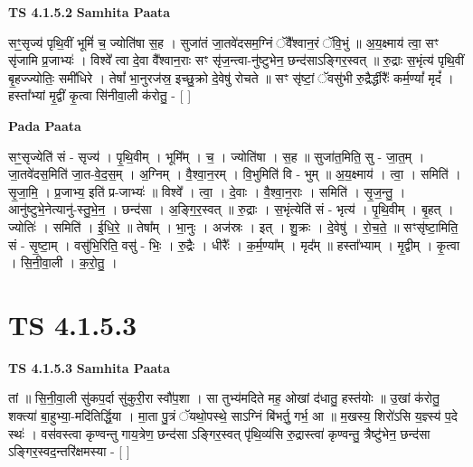 \documentclass[17pt]{extarticle}
\begin{document}
\textbf{TS 4.1.5.2 } \newline
\textbf{Samhita Paata} \newline

सꣳ॒॒सृज्य॑ पृथि॒वीं भूमिं॑ च॒ ज्योति॑षा स॒ह । सुजा॑तं जा॒तवे॑दसम॒ग्निं ॅवै᳚श्वान॒रं ॅवि॒भुं ॥ अ॒य॒क्ष्माय॑ त्वा॒ सꣳ सृ॑जामि प्र॒जाभ्यः॑ । विश्वे᳚ त्वा दे॒वा वै᳚श्वान॒राः सꣳ सृ॑ज॒न्त्वा-नु॑ष्टुभेन॒ छन्द॑साऽङ्गिर॒स्वत् ॥ रु॒द्राः स॒भृंत्य॑ पृथि॒वीं बृ॒हज्ज्योतिः॒ समी॑धिरे । तेषां᳚ भा॒नुरज॑स्र॒ इच्छु॒क्रो दे॒वेषु॑ रोचते ॥ सꣳ सृ॑ष्टां॒ ॅवसु॑भी रु॒द्रैर्द्धीरैः᳚ कर्म॒ण्यां᳚ मृदं᳚ । हस्ता᳚भ्यां मृ॒द्वीं कृ॒त्वा सि॑नीवा॒ली क॑रोतु॒ - [  ] \newline

\textbf{Pada Paata} \newline

सꣳ॒॒सृज्येति॑ सं - सृज्य॑ । पृ॒थि॒वीम् । भूमि᳚म् । च॒ । ज्योति॑षा । स॒ह ॥ सुजा॑त॒मिति॒ सु - जा॒त॒म् । जा॒तवे॑दस॒मिति॑ जा॒त-वे॒द॒स॒म् । अ॒ग्निम् । वै॒श्वा॒न॒रम् । वि॒भुमिति॑ वि - भुम् ॥ अ॒य॒क्ष्माय॑ । त्वा॒ । समिति॑ । सृ॒जा॒मि॒ । प्र॒जाभ्य॒ इति॑ प्र-जाभ्यः॑ ॥ विश्वे᳚ । त्वा॒ । दे॒वाः । वै॒श्वा॒न॒राः । समिति॑ । सृ॒ज॒न्तु॒ । आनु॑ष्टुभे॒नेत्यानु॑-स्तु॒भे॒न॒ । छन्द॑सा । अ॒ङ्गि॒र॒स्वत् ॥ रु॒द्राः । स॒भृंत्येति॑ सं - भृत्य॑ । पृ॒थि॒वीम् । बृ॒हत् । ज्योतिः॑ । समिति॑ । ई॒धि॒रे॒ ॥ तेषा᳚म् । भा॒नुः । अज॑स्रः । इत् । शु॒क्रः । दे॒वेषु॑ । रो॒च॒ते॒ ॥ सꣳसृ॑ष्टा॒मिति॒ सं - सृ॒ष्टा॒म् । वसु॑भि॒रिति॒ वसु॑ - भिः॒ । रु॒द्रैः । धीरैः᳚ । क॒र्म॒ण्या᳚म् । मृद᳚म् ॥ हस्ता᳚भ्याम् । मृ॒द्वीम् । कृ॒त्वा । सि॒नी॒वा॒ली । क॒रो॒तु॒ ।  \newline





\section{ TS 4.1.5.3 }

\textbf{TS 4.1.5.3 } \newline
\textbf{Samhita Paata} \newline

तां ॥ सि॒नी॒वा॒ली सु॑कप॒र्दा सु॑कुरी॒रा स्वौ॑प॒शा । सा तुभ्य॑मदिते मह॒ ओखां द॑धातु॒ हस्त॑योः ॥ उ॒खां क॑रोतु॒ शक्त्या॑ बा॒हुभ्या॒-मदि॑तिर्द्धि॒या । मा॒ता पु॒त्रं ॅयथो॒पस्थे॒ साऽग्निं बि॑भर्तु॒ गर्भ॒ आ ॥ म॒खस्य॒ शिरो॑ऽसि य॒ज्ञ्स्य॑ प॒दे स्थः॑ । वस॑वस्त्वा कृण्वन्तु गाय॒त्रेण॒ छन्द॑सा ऽङ्गिर॒स्वत् पृ॑थि॒व्य॑सि रु॒द्रास्त्वा॑ कृण्वन्तु॒ त्रैष्टु॑भेन॒ छन्द॑सा ऽङ्गिर॒स्वद॒न्तरि॑क्षमस्या - [  ] \newline
\end{document}
